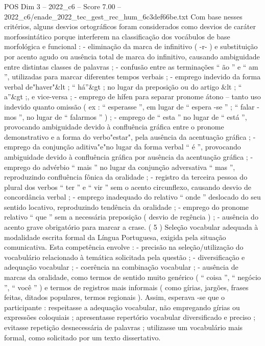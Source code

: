 \begin{textsample}{POS Dim 3 – 2022\_c6 – Score 7.00 – 2022\_c6/enade\_2022\_tec\_gest\_rec\_hum\_6c3def66be.txt}
Com base nesses critérios, alguns desvios ortográficos foram considerados como desvios de caráter morfossintático porque interferem na classificação dos vocábulos de base morfológica e funcional : - eliminação da marca de infinitivo ( -r- ) e substituição por acento agudo ou ausência total de marca do infinitivo, causando ambiguidade entre distintas classes de palavras ; - confusão entre as terminações “ ão ” e “ am ”, utilizadas para marcar diferentes tempos verbais ; - emprego indevido da forma verbal de"haver"\&lt ; “ há”\&gt ; no lugar da preposição ou do artigo \&lt ; “ a”\&gt ;, e vice-versa ; - emprego de hífen para separar pronome átono – tanto uso indevido quanto omissão ( ex : “ esperasse ”, em lugar de “ espera -se ” ; “ falar -mos ”, no lugar de “ falarmos ” ) ; - emprego de “ esta ” no lugar de “ está ”, provocando ambiguidade devido à confluência gráfica entre o pronome demonstrativo e a forma do verbo"estar", pela ausência da acentuação gráfica ; - emprego da conjunção aditiva"e"no lugar da forma verbal “ é ”, provocando ambiguidade devido à confluência gráfica por ausência da acentuação gráfica ; - emprego do advérbio “ mais ” no lugar da conjunção adversativa “ mas ”, reproduzindo confluência fônica da oralidade ; - registro da terceira pessoa do plural dos verbos “ ter ” e “ vir ” sem o acento circunflexo, causando desvio de concordância verbal ; - emprego inadequado do relativo “ onde ” deslocado do seu sentido locativo, reproduzindo tendência da oralidade ; - emprego do pronome relativo “ que ” sem a necessária preposição ( desvio de regência ) ; - ausência do acento grave obrigatório para marcar a crase. ( 5 ) Seleção vocabular adequada à modalidade escrita formal da Língua Portuguesa, exigida pela situação comunicativa.
Esta competência envolve : - precisão na seleção/utilização do vocabulário relacionado à temática solicitada pela questão ; - diversificação e adequação vocabular ; - coerência na combinação vocabular ; - ausência de marcas da oralidade, como termos de sentido muito genérico ( “ coisa ”, “ negócio ”, “ você ” ) e termos de registros mais informais ( como gírias, jargões, frases feitas, ditados populares, termos regionais ).
Assim, esperava -se que o participante : respeitasse a adequação vocabular, não empregando gírias ou expressões coloquiais ; apresentasse repertório vocabular diversificado e preciso ; evitasse repetição desnecessária de palavras ; utilizasse um vocabulário mais formal, como solicitado por um texto dissertativo.

\end{textsample}

